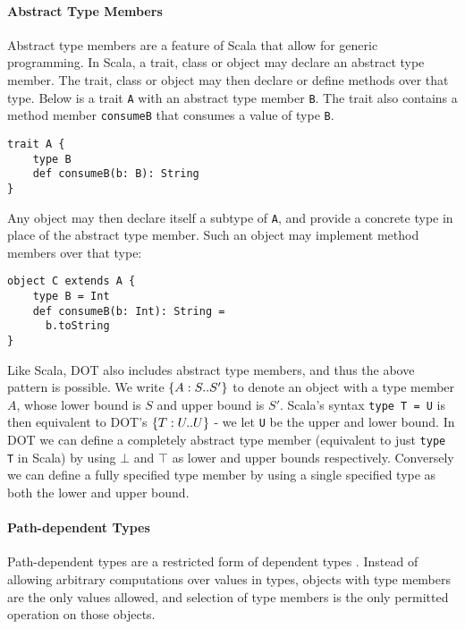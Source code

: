 \paragraph{Abstract Type Members}
Abstract type members are a feature of Scala that allow for generic programming.
In Scala, a trait, class or object may declare an abstract type member. The
trait, class or object may then declare or define methods over that type. Below
is a trait \texttt{A} with an abstract type member \texttt{B}. The trait also
contains a method member \texttt{consumeB} that consumes a value of type
\texttt{B}.

\begin{minipage}{\linewidth}
\begin{lstlisting}[mathescape]
trait A {
    type B
    def consumeB(b: B): String
}
\end{lstlisting}
\end{minipage}

\noindent Any object may then declare itself a subtype of \texttt{A}, and
provide a concrete type in place of the abstract type member. Such an object may
implement method members over that type:

\begin{minipage}{\linewidth}
\begin{lstlisting}[mathescape]
object C extends A {
    type B = Int
    def consumeB(b: Int): String =
      b.toString
}
\end{lstlisting}
\end{minipage}

\noindent Like Scala, DOT also includes abstract type members, and thus the
above pattern is possible. We write $\{A : S .. S'\}$ to denote an object with a
type member $A$, whose lower bound is $S$ and upper bound is $S'$. Scala's
syntax \texttt{type T = U} is then equivalent to DOT's $\{T : U .. U\}$ - we let
\texttt{U} be the upper and lower bound. In DOT we can define a completely
abstract type member (equivalent to just \texttt{type T} in Scala) by using
$\bot$ and $\top$ as lower and upper bounds respectively. Conversely we can
define a fully specified type member by using a single specified type as both
the lower and upper bound.

\paragraph{Path-dependent Types}
Path-dependent types are a restricted form of dependent types \cite{AGORS16}.
Instead of allowing arbitrary computations over values in types, objects with
type members are the only values allowed, and selection of type members is the
only permitted operation on those objects.

